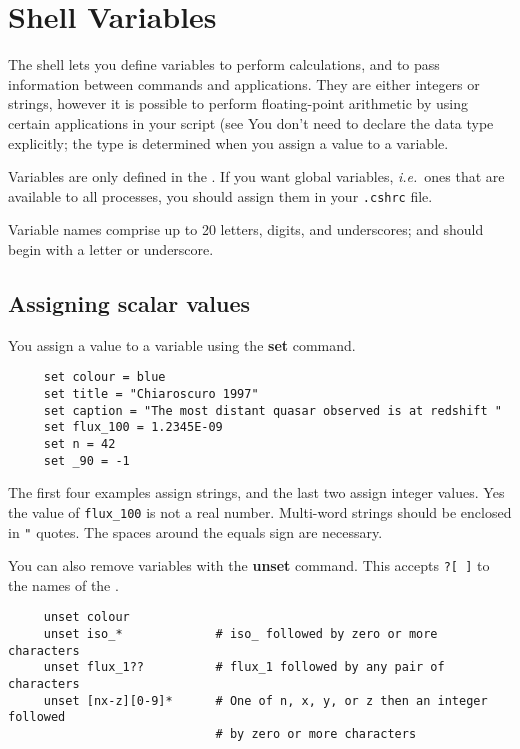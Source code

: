 \newpage
\section{Shell Variables\label{sc4_se_variables}}

The shell lets you define variables to perform calculations, and to
pass information between commands and applications.  They are either
integers or strings, however it is possible to perform floating-point
arithmetic by using certain applications in your script (see
You don't need to declare the data type explicitly; the type is
determined when you assign a value to a variable.

Variables are only defined in the .  If you want global variables, {\it i.e.}\ ones
that are available to all processes, you should assign them in your
{\tt .cshrc} file.

Variable names comprise up to 20 letters, digits, and underscores;
and should begin with a letter or underscore.

\subsection{Assigning scalar values
\label{sc4_se_assign_scalar}}

You assign a value to a variable using the {\bf set} command.

\small
\begin{verbatim}
     set colour = blue
     set title = "Chiaroscuro 1997"
     set caption = "The most distant quasar observed is at redshift "
     set flux_100 = 1.2345E-09
     set n = 42
     set _90 = -1
\end{verbatim}
\normalsize
The first four examples assign strings, and the last two assign integer
values.  Yes the value of {\tt flux\_100} is not a real number.
Multi-word strings should be enclosed in {\tt "} quotes.  The spaces
around the equals sign are necessary.

You can also remove variables with the {\bf unset} command.  This
accepts {\tt *?[~]}  to
 the names of the 
.

\small
\begin{verbatim}
     unset colour
     unset iso_*             # iso_ followed by zero or more characters
     unset flux_1??          # flux_1 followed by any pair of characters
     unset [nx-z][0-9]*      # One of n, x, y, or z then an integer followed
                             # by zero or more characters
\end{verbatim}
\normalsize


